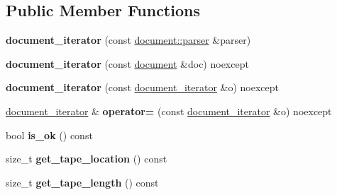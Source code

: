 \subsection*{Public Member Functions}
\begin{DoxyCompactItemize}
\item 
\mbox{\label{classsimdjson_1_1document__iterator_a88e9151c03b0d467023ebc680fd55147}} 
{\bfseries document\+\_\+iterator} (const \hyperlink{classsimdjson_1_1document_1_1parser}{document\+::parser} \&parser)
\item 
\mbox{\label{classsimdjson_1_1document__iterator_acb57a4c424c18e6872555bb3c9ec4f4c}} 
{\bfseries document\+\_\+iterator} (const \hyperlink{classsimdjson_1_1document}{document} \&doc) noexcept
\item 
\mbox{\label{classsimdjson_1_1document__iterator_a99a96d1780b31f717c21b8ed38a85894}} 
{\bfseries document\+\_\+iterator} (const \hyperlink{classsimdjson_1_1document__iterator}{document\+\_\+iterator} \&o) noexcept
\item 
\mbox{\label{classsimdjson_1_1document__iterator_a924a2edb8eb555c621299afd589c5513}} 
\hyperlink{classsimdjson_1_1document__iterator}{document\+\_\+iterator} \& {\bfseries operator=} (const \hyperlink{classsimdjson_1_1document__iterator}{document\+\_\+iterator} \&o) noexcept
\item 
\mbox{\label{classsimdjson_1_1document__iterator_a3c24419511bbdbc9c244b14ef4f1c866}} 
bool {\bfseries is\+\_\+ok} () const
\item 
\mbox{\label{classsimdjson_1_1document__iterator_a407f8f13c37a14ff2c2d924f880af4f2}} 
size\+\_\+t {\bfseries get\+\_\+tape\+\_\+location} () const
\item 
\mbox{\label{classsimdjson_1_1document__iterator_a1e2e1edbef244d211d2aaf05cbc921cd}} 
size\+\_\+t {\bfseries get\+\_\+tape\+\_\+length} () const
\item 
\mbox{\label{classsimdjson_1_1document__iterator_a0bc75c8e01fe9745b2f7688ae0b4f9a2}} 

\end{DoxyCompactItemize}
